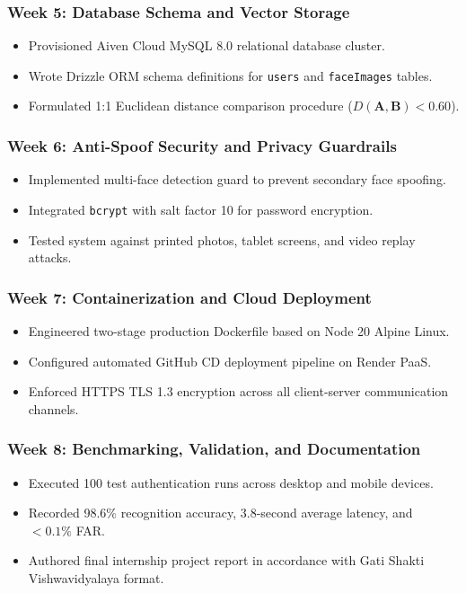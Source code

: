 \documentclass[12pt,a4paper,oneside]{article}
\begin{document}
\subsubsection{Week 5: Database Schema and Vector Storage}
\begin{itemize}
    \item Provisioned Aiven Cloud MySQL 8.0 relational database cluster.
    \item Wrote Drizzle ORM schema definitions for \texttt{users} and \texttt{faceImages} tables.
    \item Formulated 1:1 Euclidean distance comparison procedure ($D(\mathbf{A}, \mathbf{B}) < 0.60$).
\end{itemize}

\subsubsection{Week 6: Anti-Spoof Security and Privacy Guardrails}
\begin{itemize}
    \item Implemented multi-face detection guard to prevent secondary face spoofing.
    \item Integrated \texttt{bcrypt} with salt factor 10 for password encryption.
    \item Tested system against printed photos, tablet screens, and video replay attacks.
\end{itemize}

\subsubsection{Week 7: Containerization and Cloud Deployment}
\begin{itemize}
    \item Engineered two-stage production Dockerfile based on Node 20 Alpine Linux.
    \item Configured automated GitHub CD deployment pipeline on Render PaaS.
    \item Enforced HTTPS TLS 1.3 encryption across all client-server communication channels.
\end{itemize}

\subsubsection{Week 8: Benchmarking, Validation, and Documentation}
\begin{itemize}
    \item Executed 100 test authentication runs across desktop and mobile devices.
    \item Recorded 98.6\% recognition accuracy, 3.8-second average latency, and $< 0.1\%$ FAR.
    \item Authored final internship project report in accordance with Gati Shakti Vishwavidyalaya format.
\end{itemize}
\end{document}
